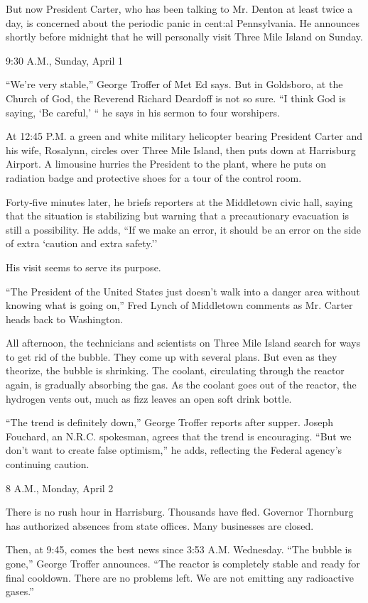 But now President Carter, who has been talking to Mr. Denton at least
twice a day, is concerned about the periodic panic in cent:al
Pennsylvania. He announces shortly before midnight that he will
personally visit Three Mile Island on Sunday.

9:30 A.M., Sunday, April 1

``We're very stable,'' George Troffer of Met Ed says. But in Goldsboro,
at the Church of God, the Reverend Richard Deardoff is not so sure. ``I
think God is saying, `Be careful,' `` he says in his sermon to four
worshipers.

At 12:45 P.M. a green and white military helicopter bearing President
Carter and his wife, Rosalynn, circles over Three Mile Island, then puts
down at Harrisburg Airport. A limousine hurries the President to the
plant, where he puts on radiation badge and protective shoes for a tour
of the control room.

Forty‐five minutes later, he briefs reporters at the Middletown civic
hall, saying that the situation is stabilizing but warning that a
precautionary evacuation is still a possibility. He adds, ``If we make
an error, it should be an error on the side of extra `caution and extra
safety.''

His visit seems to serve its purpose.

``The President of the United States just doesn't walk into a danger
area without knowing what is going on,'' Fred Lynch of Middletown
comments as Mr. Carter heads back to Washington.

All afternoon, the technicians and scientists on Three Mile Island
search for ways to get rid of the bubble. They come up with several
plans. But even as they theorize, the bubble is shrinking. The coolant,
circulating through the reactor again, is gradually absorbing the gas.
As the coolant goes out of the reactor, the hydrogen vents out, much as
fizz leaves an open soft drink bottle.

``The trend is definitely down,'' George Troffer reports after supper.
Joseph Fouchard, an N.R.C. spokesman, agrees that the trend is
encouraging. ``But we don't want to create false optimism,'' he adds,
reflecting the Federal agency's continuing caution.

8 A.M., Monday, April 2

There is no rush hour in Harrisburg. Thousands have fled. Governor
Thornburg has authorized absences from state offices. Many businesses
are closed.

Then, at 9:45, comes the best news since 3:53 A.M. Wednesday. ``The
bubble is gone,'' George Troffer announces. ``The reactor is completely
stable and ready for final cooldown. There are no problems left. We are
not emitting any radioactive gases.''

